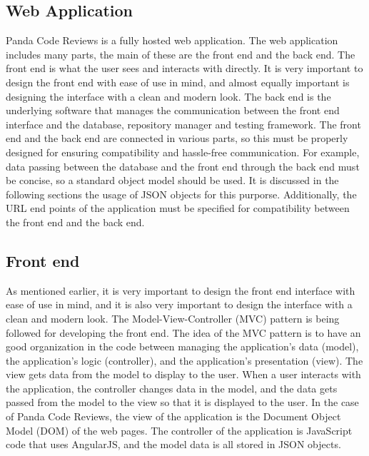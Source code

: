 
\subsection{Web Application}

Panda Code Reviews is a fully hosted web application. The web application
includes many parts, the main of these are the front end and the back end. The
front end is what the user sees and interacts with directly. It is very
important to design the front end with ease of use in mind, and almost equally
important is designing the interface with a clean and modern look. The back end
is the underlying software that manages the communication between the front end
interface and the database, repository manager and testing framework. The front
end and the back end are connected in various parts, so this must be properly
designed for ensuring compatibility and hassle-free communication. For example,
data passing between the database and the front end through the back end must
be concise, so a standard object model should be used. It is discussed in the
following sections the usage of JSON objects for this purporse. Additionally,
the URL end points of the application must be specified for compatibility
between the front end and the back end.

\subsection{Front end}

As mentioned earlier, it is very important to design the front end interface
with ease of use in mind, and it is also very important to design the interface
with a clean and modern look. The Model-View-Controller (MVC) pattern is being
followed for developing the front end. The idea of the MVC pattern is to have an
good organization in the code between managing the application's data (model),
the application's logic (controller), and the application's presentation (view).
The view gets data from the model to display to the user. When a user interacts
with the application, the controller changes data in the model, and the data
gets passed from the model to the view so that it is displayed to the user. In
the case of Panda Code Reviews, the view of the application is the Document
Object Model (DOM) of the web pages. The controller of the application is
JavaScript code that uses AngularJS, and the model data is all stored in JSON
objects.

